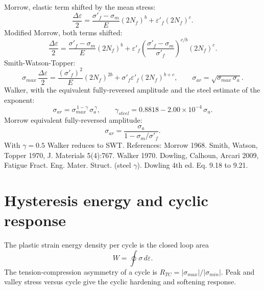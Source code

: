 \documentclass[11pt]{article}
\begin{document}
Morrow, elastic term shifted by the mean stress:
\begin{equation}
\frac{\Delta\varepsilon}{2} = \frac{\sigma'_f-\sigma_m}{E}(2N_f)^{b} + \varepsilon'_f (2N_f)^{c}.
\end{equation}
Modified Morrow, both terms shifted:
\begin{equation}
\frac{\Delta\varepsilon}{2} = \frac{\sigma'_f-\sigma_m}{E}(2N_f)^{b}
+ \varepsilon'_f\left(\frac{\sigma'_f-\sigma_m}{\sigma'_f}\right)^{c/b}(2N_f)^{c}.
\end{equation}
Smith-Watson-Topper:
\begin{equation}
\sigma_{max}\,\frac{\Delta\varepsilon}{2} = \frac{(\sigma'_f)^2}{E}(2N_f)^{2b}
+ \sigma'_f \varepsilon'_f (2N_f)^{b+c},
\qquad
\sigma_{ar} = \sqrt{\sigma_{max}\,\sigma_a}.
\end{equation}
Walker, with the equivalent fully-reversed amplitude and the steel estimate of
the exponent:
\begin{equation}
\sigma_{ar} = \sigma_{max}^{\,1-\gamma}\,\sigma_a^{\,\gamma},
\qquad
\gamma_{steel} = 0.8818 - 2.00\times10^{-4}\,\sigma_u.
\end{equation}
Morrow equivalent fully-reversed amplitude:
\begin{equation}
\sigma_{ar} = \frac{\sigma_a}{1 - \sigma_m/\sigma'_f}.
\end{equation}
With \(\gamma=0.5\) Walker reduces to SWT. References: Morrow 1968. Smith, Watson,
Topper 1970, J. Materials 5(4):767. Walker 1970. Dowling, Calhoun, Arcari 2009,
Fatigue Fract. Eng. Mater. Struct. (steel \(\gamma\)). Dowling 4th ed. Eq. 9.18 to 9.21.

\section{Hysteresis energy and cyclic response}
The plastic strain energy density per cycle is the closed loop area
\begin{equation}
W = \oint \sigma\,d\varepsilon.
\end{equation}
The tension-compression asymmetry of a cycle is
\(R_{TC} = \lvert\sigma_{max}\rvert / \lvert\sigma_{min}\rvert\). Peak and valley
stress versus cycle give the cyclic hardening and softening response.
\end{document}
